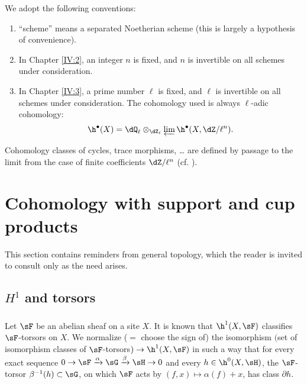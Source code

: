 \documentclass[oneside]{book}
\begin{document}
We adopt the following conventions:
\begin{enumerate}[\indent 1)]
  \item ``scheme'' means a separated Noetherian scheme (this is largely a
    hypothesis of convenience).
  \item In Chapter \ref{IV:2}, an integer $n$ is fixed, and $n$ is invertible
    on all schemes under consideration.
  \item In Chapter \ref{IV:3}, a prime number $\ell$ is fixed, and $\ell$ is
    invertible on all schemes under consideration. The cohomology used is
    always $\ell$-adic cohomology:
    \[
      \h^\bullet(X) = \dQ_\ell\otimes_{\dZ_\ell} \varprojlim \h^\bullet(X,\dZ/\ell^n) \text{.}
    \]
\end{enumerate}
Cohomology classes of cycles, trace morphisms, \ldots{} are defined by passage
to the limit from the case of finite coefficients $\dZ/\ell^n$ (cf.
\cite[VI]{sga5}).




















\section{Cohomology with support and cup products}\label{IV:1}

This section contains reminders from general topology, which the reader is
invited to consult only as the need arises.










\subsection{\texorpdfstring{$H^1$}{H1} and torsors}\label{IV:1-1}






\subsubsection{}\label{IV:1-1-1}

Let $\sF$ be an abelian sheaf on a site $X$. It is known that
$\h^1(X,\sF)$ classifies $\sF$-torsors on $X$. We normalize ($=$ choose the
sign of) the isomorphism $($set of isomorphism classes of
$\sF$-torsors$)\to \h^1(X,\sF)$ in such a way that for every exact sequence
$0\to \sF\xrightarrow\alpha\sG\xrightarrow\beta\sH\to 0$ and every
$h\in\h^0(X,\sH)$, the $\sF$-torsor $\beta^{-1}(h)\subset \sG$, on which
$\sF$ acts by $(f,x)\mapsto \alpha(f)+x$, has class $\partial h$.
\end{document}
